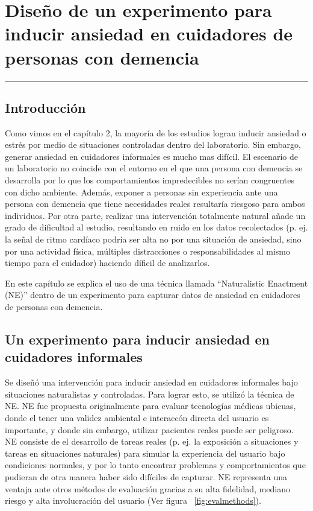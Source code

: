 \chapter{Dise\~no de un experimento para inducir ansiedad en cuidadores de personas con demencia}\label{capit:cap3}
\vspace{-2.0325ex}%
\noindent
\rule{\textwidth}{0.5pt}
\vspace{-5.5ex}%
\newcommand{\pushline}{\Indp}%
\section{Introducci\'on}\label{secc:introduction}

Como vimos en el cap\'itulo 2, la mayor\'ia de los estudios logran inducir ansiedad o estr\'es por medio de situaciones controladas dentro del laboratorio. Sin embargo, generar ansiedad en cuidadores informales es mucho mas dif\'icil. El escenario de un laboratorio no coincide con el entorno en el que una persona con demencia se desarrolla por lo que los comportamientos impredecibles no ser\'ian congruentes con dicho ambiente. Adem\'as, exponer a personas sin experiencia ante una persona con demencia que tiene necesidades reales resultar\'ia riesgoso para ambos individuos. Por otra parte, realizar una intervenci\'on totalmente natural a\~nade un grado de dificultad al estudio, resultando en ruido en los datos recolectados (p. ej. la se\~nal de ritmo card\'iaco podr\'ia ser alta no por una situaci\'on de ansiedad, sino por una actividad f\'isica, m\'ultiples distracciones o responsabilidades al mismo tiempo para el cuidador) haciendo d\'ificil de analizarlos.

En este cap\'itulo se explica el uso de una t\'ecnica llamada ``Naturalistic Enactment (NE)'' dentro de un experimento para capturar datos de ansiedad en cuidadores de personas con demencia.


\section{Un experimento para inducir ansiedad en cuidadores informales}\label{secc:experiment}
Se dise\~n\'o una intervenci\'on para inducir ansiedad en cuidadores informales bajo situaciones naturalistas y controladas. Para lograr esto, se utiliz\'o la t\'ecnica de NE. NE fue propuesta originalmente para evaluar tecnolog\'ias m\'edicas ubicuas, donde el tener una validez ambiental e interacc\'on directa del usuario es importante, y donde sin embargo, utilizar pacientes reales puede ser peligroso\citep{Castro11}. NE consiste de el desarrollo de tareas reales (p. ej. la exposici\'on a situaciones y tareas en situaciones naturales) para simular la experiencia del usuario bajo condiciones normales, y por lo tanto encontrar problemas y comportamientos que pudieran de otra manera haber sido dif\'iciles de capturar. NE representa una ventaja ante otros m\'etodos de evaluaci\'on gracias a su alta fidelidad, mediano riesgo y alta involucraci\'on del usuario (Ver figura ~\ref{fig:evalmethods}).

